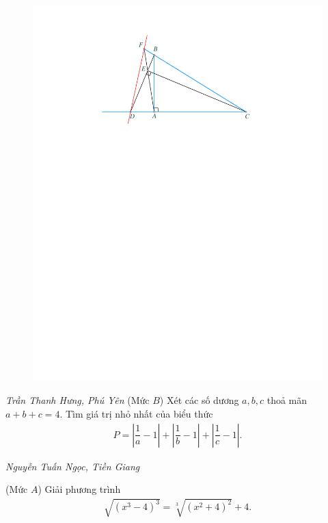 \begin{multicols}{2}
\begin{figure}[H]
		\vspace*{-5pt}
		\centering
		\captionsetup{labelformat= empty, justification=centering}
		\includegraphics[width= 1\linewidth]{P615}
		\vspace*{-15pt}
	\end{figure}
	\hfill	\textit{Trần Thanh Hưng, Phú Yên}
	\vskip 0.05cm
	{}
	(Mức $B$) Xét các số dương $a,b,c$ thoả mãn $a+b+c=4$. Tìm giá trị nhỏ nhất của biểu thức 
	\begin{align*}
		P=\left|\dfrac 1a-1\right|+\left|\dfrac 1b-1\right|+\left|\dfrac 1c-1\right|.
	\end{align*}
	\begin{flushright}
		\textit{Nguyễn Tuấn Ngọc, Tiền Giang}
	\end{flushright}
	{}
	(Mức $A$) Giải phương trình
	\begin{align*}
		\sqrt{(x^3-4)^3}=\sqrt[3]{(x^2+4)^2}+4.
	\end{align*} 

\end{multicols}
